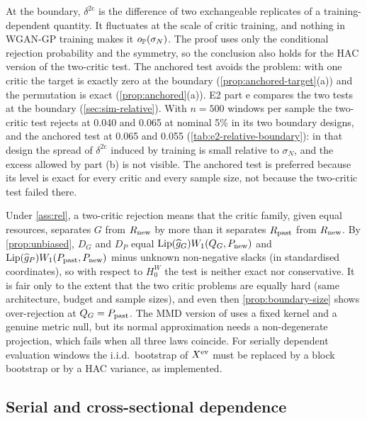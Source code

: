 At the boundary, $\delta^{\mathrm{2c}}$ is the difference of two exchangeable replicates of a
training-dependent quantity. It fluctuates at the scale of critic training, and nothing in
WGAN-GP training makes it $o_{\mathbb{P}}(\sigma_N)$. The proof uses only the conditional rejection
probability and the symmetry, so the conclusion also holds for the HAC version of the two-critic
test. The anchored test avoids the problem: with one critic the target is exactly zero at the
boundary (\cref{prop:anchored-target}(a)) and the permutation is exact (\cref{prop:anchored}(a)).
E2 part e compares the two tests at the boundary (\cref{sec:sim-relative}). With $n=500$ windows
per sample the two-critic test rejects at 0.040 and 0.065 at nominal 5\% in its two boundary
designs, and the anchored test at 0.065 and 0.055 (\cref{tab:e2-relative-boundary}): in that
design the spread of $\delta^{\mathrm{2c}}$ induced by training is small relative to $\sigma_N$,
and the excess allowed by part (b) is not visible. The anchored test is preferred because its level
is exact for every critic and every sample size, not because the two-critic test failed there.

\begin{remark}\label{rem:rel-guarantee}
Under \cref{ass:rel}, a two-critic rejection means that the critic family, given equal resources,
separates $G$ from $R_{\mathrm{new}}$ by more than it separates $R_{\mathrm{past}}$ from $R_{\mathrm{new}}$. By
\cref{prop:unbiased}, $D_G$ and $D_P$ equal $\operatorname{Lip}(\widehat{g}_G)W_{1}(Q_{G},P_{\mathrm{new}})$ and
$\operatorname{Lip}(\widehat{g}_P)W_{1}(P_{\mathrm{past}},P_{\mathrm{new}})$ minus unknown non-negative slacks (in standardised coordinates),
so with respect to $H_0^W$ the test is neither exact nor conservative. It is fair only to the
extent that the two critic problems are equally hard (same architecture, budget and sample sizes),
and even then \cref{prop:boundary-size} shows over-rejection at $Q_{G}=P_{\mathrm{past}}$. The MMD version of
\citet{bounliphone2016test} uses a fixed kernel and a genuine metric null, but its normal
approximation needs a non-degenerate projection, which fails when all three laws coincide. For
serially dependent evaluation windows the i.i.d.\ bootstrap of $X^{\mathrm{ev}}$ must be replaced by a
block bootstrap \citep{kunsch1989jackknife,politis1994stationary,lahiri2003resampling} or by a HAC
variance, as implemented.
\end{remark}

\subsection{Serial and cross-sectional dependence}\label{sec:theory-dependence}

